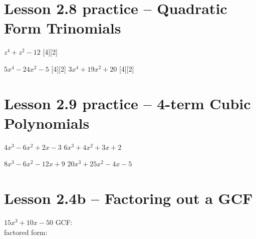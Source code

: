 \documentclass[12pt,letterpaper]{memoir}
\begin{document}
\pagestyle{plain}
\checkandfixthelayout
\raggedbottom


\noindent
{}


\section*{Lesson 2.8 practice -- Quadratic Form Trinomials}
%
%
{
    $ z^4 + z^2 - 12 $ 
    \tcblower 
    [4][2]
}


\myProblemsWithContent
{
    $ 5x^4 - 24x^2 - 5 $ 
    \tcblower 
    [4][2]
}
{
    $ 3x^4 + 19x^2 + 20 $ 
    \tcblower 
    [4][2]
}

%
%

\section*{Lesson 2.9 practice -- 4-term Cubic Polynomials}

\myProblemsWithContent%
{
    $ 4x^3 - 6x^2 + 2x - 3 $ 
    \tcblower 
}
{
    $ 6x^3 + 4x^2 + 3x + 2 $ 
    \tcblower 
}


\myProblemsWithContent
{
    $ 8x^3 - 6x^2 - 12x + 9 $ 
    \tcblower 
}
{
    $ 20x^3 + 25x^2 - 4x - 5 $ 
    \tcblower 
}

%
%

\section*{Lesson 2.4b -- Factoring out a GCF}

{
    $15x^3 + 10x - 50$
    \tcblower
    \vspace{1.5in}
    GCF: \\
    factored form: 
        ~%
}
\end{document}
